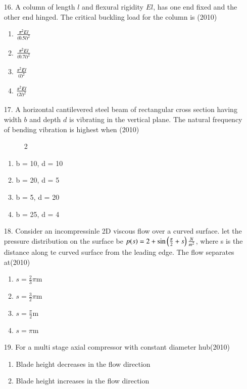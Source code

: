 \documentclass[journal]{IEEEtran}
\begin{document}
\begin{enumerate}
 \item[16.] A column of length $l$ and flexural rigidity $El$, has one end fixed and the other end hinged. The critical buckling load for the column is \hfill (2010)
 \begin{enumerate}[label=(\Alph*)]
    \item $\frac{\pi^2El}{\left(0.5l\right)^2}$
    \item $\frac{\pi^2El}{\left(0.7l\right)^2}$
    \item $\frac{\pi^2El}{\left(l\right)^2}$
    \item $\frac{\pi^2El}{\left(2l\right)^2}$
 \end{enumerate}
 \item[17.] A horizontal cantilevered steel beam of rectangular cross section having width $b$ and depth $d$ is vibrating in the vertical plane. The natural frequency of bending vibration is highest when \hfill (2010)
 \begin{figure}[!ht]
    \centering
    \caption{2}
    \label{fig:2}
\end{figure}
 \begin{enumerate}[label=(\Alph*)]
    \item b = 10, d = 10
    \item b = 20, d = 5
    \item b = 5, d = 20
    \item b = 25, d = 4
 \end{enumerate}
 \item[18.] Consider an incompressinle 2D viscous flow over a curved surface. let the pressure distribution on the surface be $p(s) = 2 + \sin\left(\frac{\pi}{2}+s\right)\frac{N}{m^2}$, where s is the distance along te curved surface from the leading edge. The flow separates at\hfill (2010)
 \begin{enumerate}[label=(\Alph*)]
    \item $s=\frac{2}{3}\pi$m
    \item $s=\frac{3}{2}\pi$m
    \item $s=\frac{\pi}{2}$m
    \item $s=\pi$m
 \end{enumerate}
 \item[19.] For a multi stage axial compressor with constant diameter hub\hfill (2010)
 \begin{enumerate}[label=(\Alph*)]
    \item Blade height decreases in the flow direction
    \item Blade height increases in the flow direction

\end{enumerate}
\end{enumerate}
\end{document}
